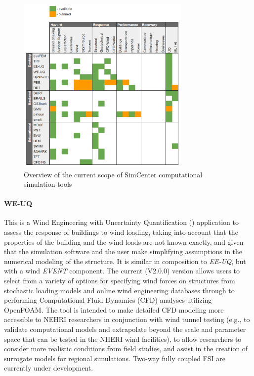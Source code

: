 \begin{figure}[htb]
    \centering
    \includegraphics[width=0.75\textwidth, angle = 0]{Figures/tool_overview.png}
    \caption{Overview of the current scope of SimCenter computational simulation tools}
    \label{fig:intro_tool_overview}
\end{figure}

\paragraph{WE-UQ} This is a Wind Engineering with Uncertainty Quantification () application to assess the response of buildings to wind loading, taking into account that the properties of the building and the wind loads are not known exactly, and given that the simulation software and the user make simplifying assumptions in the numerical modeling of the structure. It is similar in composition to \emph{EE-UQ}, but with a wind \emph{EVENT} component.  The current (V2.0.0) version allows users to select from a variety of options for specifying wind forces on structures from stochastic loading models and online wind engineering databases through to performing Computational Fluid Dynamics (CFD) analyses utilizing OpenFOAM. The tool is intended to make detailed CFD modeling more accessible to NEHRI researchers in conjunction with wind tunnel testing (e.g., to validate computational models and extrapolate beyond the scale and parameter space that can be tested in the NHERI wind facilities), to allow researchers to consider more realistic conditions from field studies, and assist in the creation of surrogate models for regional simulations. Two-way fully coupled FSI are currently under development.

